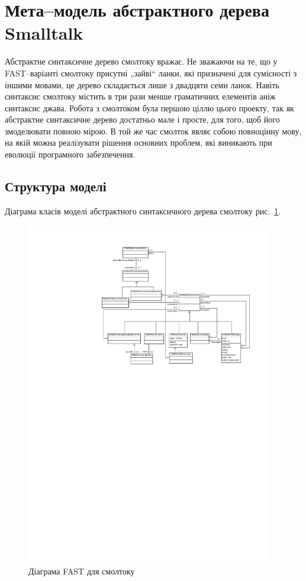 \documentclass[12pt,a4paper]{article}
\begin{document}
\clearpage

\section{Мета--модель абстрактного дерева Smalltalk}

Абстрактне синтаксичне дерево смолтоку вражає. Не зважаючи на те, що у FAST--варіанті смолтоку присутні „зайві“ ланки, які призначені для сумісності з іншими мовами, це дерево складається лише з двадцяти семи ланок. Навіть синтаксис смолтоку містить в три рази менше граматичних елементів аніж синтаксис джава\cite{meet-grammars}. Робота з смолтоком була першою ціллю цього проекту, так як абстрактне синтаксичне дерево достатньо мале і просте, для того, щоб його змоделювати повною мірою. В той же час смолток являє собою повноцінну мову, на якій можна реалізувати рішення основних проблем, які виникають при еволюції програмного забезпечення.

\subsection{Структура моделі}

Діаграма класів моделі абстрактного синтаксичного дерева смолтоку рис.~\ref{smtFast}.

\begin{figure}[h]
  \centering
    \includegraphics[width=0.95\textwidth]{SmalltalkASTClassDiagram}
  \caption{Діаграма FAST для смолтоку\label{smtFast}}
\end{figure}
\end{document}
